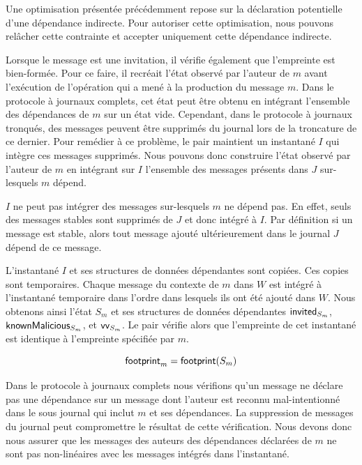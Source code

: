 \begin{remark}
Une optimisation présentée précédemment repose sur la déclaration potentielle d'une dépendance indirecte.
Pour autoriser cette optimisation, nous pouvons relâcher cette contrainte et accepter uniquement cette dépendance indirecte.
\end{remark}

Lorsque le message est une invitation, il vérifie également que l'empreinte est bien-formée.
Pour ce faire, il recréait l'état observé par l'auteur de $m$ avant l'exécution de l'opération qui a mené à la production du message $m$.
Dans le protocole à journaux complets, cet état peut être obtenu en intégrant l'ensemble des dépendances de $m$ sur un état vide.
Cependant, dans le protocole à journaux tronqués, des messages peuvent être supprimés du journal lors de la troncature de ce dernier.
Pour remédier à ce problème, le pair maintient un instantané $I$ qui intègre ces messages supprimés.
Nous pouvons donc construire l'état observé par l'auteur de $m$ en intégrant sur $I$ l'ensemble des messages présents dans $J$ sur-lesquels $m$ dépend.

\begin{remark}
$I$ ne peut pas intégrer des messages sur-lesquels $m$ ne dépend pas.
En effet, seuls des messages stables sont supprimés de $J$ et donc intégré à $I$.
Par définition si un message est stable, alors tout message ajouté ultérieurement dans le journal $J$ dépend de ce message.
\end{remark}

L'instantané $I$ et ses structures de données dépendantes sont copiées.
Ces copies sont temporaires.
Chaque message du contexte de $m$ dans $W$ est intégré à l'instantané temporaire dans l'ordre dans lesquels ils ont été ajouté dans $W$.
Nous obtenons ainsi l'état $S_m$ et ses structures de données dépendantes $\operatorname{\mathsf{invited}}_{S_m}$, $\operatorname{\mathsf{knownMalicious}}_{S_m}$, et $\operatorname{\mathsf{vv}}_{S_m}$.
Le pair vérifie alors que l'empreinte de cet instantané est identique à l'empreinte spécifiée par $m$.

\begin{equation*}
    \operatorname{\mathsf{footprint}}_m = \operatorname{\mathsf{footprint}}(S_m)
\end{equation*}

Dans le protocole à journaux complets nous vérifions qu'un message ne déclare pas une dépendance sur un message dont l'auteur est reconnu mal-intentionné dans le sous journal qui inclut $m$ et ses dépendances.
La suppression de messages du journal peut compromettre le résultat de cette vérification.
Nous devons donc nous assurer que les messages des auteurs des dépendances déclarées de $m$ ne sont pas non-linéaires avec les messages intégrés dans l'instantané.

